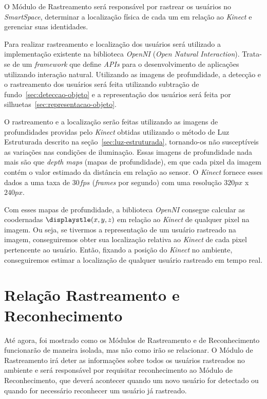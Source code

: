 	O Módulo de Rastreamento será responsável por rastrear os usuários no \textit{SmartSpace}, determinar a localização física de cada um em relação ao \textit{Kinect} e gerenciar suas identidades.

	Para realizar rastreamento e localização dos usuários será utilizado a implementação existente na biblioteca \textit{OpenNI} (\textit{Open Natural Interaction}). Trata-se de um \textit{framework} que define \textit{APIs} para o desenvolvimento de aplicações utilizando interação natural. Utilizando as imagens de profundidade, a detecção e o rastreamento dos usuários será feita utilizando subtração de fundo~\ref{sec:deteccao-objeto} e a representação dos usuários será feita por silhuetas~\ref{sec:representacao-objeto}. 

	O rastreamento e a localização serão feitas utilizando as imagens de profundidades providas pelo \textit{Kinect} obtidas utilizando o método de Luz Estruturada descrito na seção~\ref{sec:luz-estruturada}, tornando-os não susceptíveis as variações nas condições de iluminação. Essas imagens de profundidade nada mais são que \textit{depth maps} (mapas de profundidade), em que cada pixel da imagem contém o valor estimado da distância em relação ao sensor. O \textit{Kinect} fornece esses dados a uma taxa de $\displaystyle 30 fps$ (\textit{frames} por segundo) com uma resolução $\displaystyle 320px$ x $\displaystyle 240px$.
	
	Com esses mapas de profundidade, a biblioteca \textit{OpenNI} consegue calcular as coodernadas $\displaystle (x,y,z)$ em relação ao \textit{Kinect} de qualquer pixel na imagem. Ou seja, se tivermos a representação de um usuário rastreado na imagem, conseguiremos obter sua localização relativa ao \textit{Kinect} de cada pixel pertencente ao usuário. Então, fixando a posição do \textit{Kinect} no ambiente, conseguiremos estimar a localização de qualquer usuário rastreado em tempo real.

\section{Relação Rastreamento e Reconhecimento}
\label{sec:rastreamento-reconhecimento}

	Até agora, foi mostrado como os Módulos de Rastreamento e de Reconhecimento funcionarão de maneira isolada, mas não como irão se relacionar. O Módulo de Rastreamento irá deter as informações sobre todos os usuários rastreados no ambiente e será responsável por requisitar reconhecimento ao Módulo de Reconhecimento, que deverá acontecer quando um novo usuário for detectado ou quando for necessário reconhecer um usuário já rastreado.

